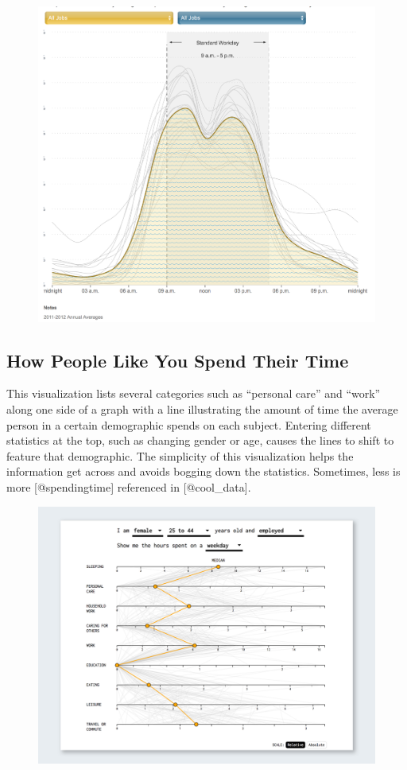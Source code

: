\documentclass[]{book}
\theoremstyle{definition}
\theoremstyle{definition}
\theoremstyle{definition}
\theoremstyle{remark}
\begin{document}
\begin{figure}
\centering
\includegraphics{images/npr_workday.png}
\caption{}
\end{figure}

\subsection{How People Like You Spend Their
Time}\label{how-people-like-you-spend-their-time}

This visualization lists several categories such as ``personal care''
and ``work'' along one side of a graph with a line illustrating the
amount of time the average person in a certain demographic spends on
each subject. Entering different statistics at the top, such as changing
gender or age, causes the lines to shift to feature that demographic.
The simplicity of this visualization helps the information get across
and avoids bogging down the statistics. Sometimes, less is more
{[}@spendingtime{]} referenced in {[}@cool\_data{]}.

\begin{figure}
\centering
\includegraphics{images/SpendingTime.png}
\caption{}
\end{figure}
\end{document}
